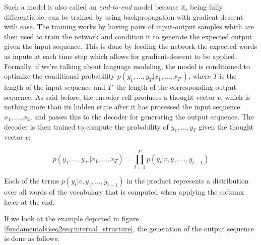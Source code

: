 Such a model is also called an \emph{end-to-end} model because it, being fully differentiable, can be trained by using backpropagation with gradient-descent with ease. The training works by having pairs of input-output samples which are then used to train the network and condition it to generate the expected output given the input sequence. This is done by feeding the network the expected words as inputs at each time step which allows for gradient-descent to be applied. Formally, if we're talking about language modeling, the model is conditioned to optimize the conditional probability $p(y_1, \dots, y_{T}|x_1, \dots, x_{T'})$, where $T$ is the length of the input sequence and $T'$ the length of the corresponding output sequence. As said before, the encoder cell produces a thought vector $v$, which is nothing more than its hidden state after it has processed the input sequence $x_1, \dots, x_2$, and passes this to the decoder for generating the output sequence. The decoder is then trained to compute the probability of $y_1, \dots, y_T$ given the thought vector $v$:

\begin{equation}
p(y_1,\dots,y_{T'}|x_1,\dots,x_{T}) = \prod_{t=1}^{T'} p(y_t|v,y_1,\dots,y_{t-1})
\end{equation}

Each of the terms $p(y_t|v,y_1,\dots,y_{t-1})$ in the product represents a distribution over all words of the vocabulary that is computed when applying the softmax layer at the end.

If we look at the example depicted in figure \ref{fundamentals:seq2seq:internal_structure}, the generation of the output sequence is done as follows:

